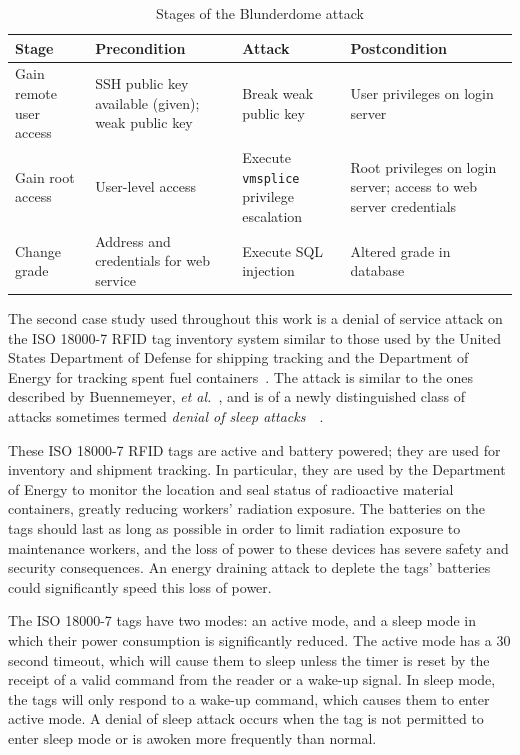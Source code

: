 \begin{table}
\centering %
\begin{tabular}{p{1.5in}|p{1in}|p{1in}|p{1in}}
Stage & Precondition	&	Attack	&	Postcondition \\ \hline \hline
Gain remote user access & SSH public key available (given); weak public key 
	& Break weak public key & User privileges on login server \\ \hline
Gain root access & User-level access & Execute \texttt{vmsplice} privilege escalation 
	& Root privileges on login server; access to web server credentials \\ \hline
Change grade & Address and credentials for web service & Execute SQL injection & Altered grade in database
\end{tabular}
\caption{Stages of the Blunderdome attack}
\label{table:blundertasks}
\end{table}
The second case study used throughout this work is a denial of service attack
on the ISO 18000-7 RFID tag inventory system similar to those used by the United States
Department of Defense for shipping tracking and the Department of Energy for tracking spent
fuel containers~\cite{chen2009radiofrequency}. The attack
is similar to the ones described by Buennemeyer, \emph{et al.}~\cite{buennemeyer2006battery},
and is of a newly distinguished class of attacks sometimes termed \emph{denial
of sleep attacks}~\cite{brownfield2005wireless}~\cite{raymond2009effects}.

These ISO 18000-7 RFID tags are active and battery powered; they are used for inventory and
shipment tracking. In particular, they are used by the Department of Energy to monitor
the location and seal status of
radioactive material containers, greatly reducing workers' radiation exposure. 
The batteries on the tags should last as long as
possible in order to limit radiation exposure to maintenance workers, and
the loss of power to these devices has severe safety and security consequences.
An energy draining attack to deplete the tags' batteries could significantly
speed this loss of power.

The ISO 18000-7 tags have two modes: an active mode, and a sleep mode in which their
power consumption is significantly reduced. The active mode has a 30 second timeout,
which will cause them to sleep unless the timer is reset by the receipt of a valid
command from the reader or a wake-up signal. In sleep mode, the tags will only respond to a
wake-up command, which causes them to enter active mode.
A denial of sleep attack occurs when the tag is not permitted to enter sleep mode or is
awoken more frequently than normal.

